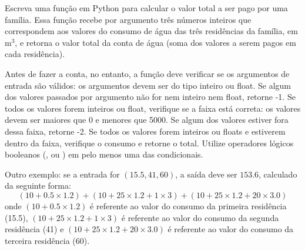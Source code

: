 \begin{enumerate}[label=\textbf{Q\arabic*.}]
    Escreva uma função em Python para calcular o valor total a ser pago por uma família. Essa função recebe por argumento três números inteiros que correspondem aos valores do consumo de água das três residências da família, em $\text{m}^3$, e retorna o valor total da conta de água (soma dos valores a serem pagos em cada residência).

    Antes de fazer a conta, no entanto, a função deve verificar se os argumentos de entrada são válidos: os argumentos devem ser do tipo inteiro ou float. Se algum dos valores passados por argumento não for nem inteiro nem float, retorne -1. Se todos os valores forem inteiros ou float, verifique se a faixa está correta: os valores devem ser maiores que 0 e menores que 5000. Se algum dos valores estiver fora dessa faixa, retorne -2. Se todos os valores forem inteiros ou floats e estiverem dentro da faixa, verifique o consumo e retorne o total. Utilize operadores lógicos booleanos (,  ou ) em pelo menos uma das condicionais. 

    Outro exemplo: se a entrada for $(15.5, 41, 60)$, a saída deve ser $153.6$, calculado da seguinte forma: 
    $$(10 + 0.5 \times 1.2) + (10 + 25 \times 1.2 + 1 \times 3) + (10 + 25 \times 1.2 + 20 \times 3.0)$$ 
    onde $(10 + 0.5 \times 1.2)$ é referente ao valor do consumo da primeira residência (15.5), $(10 + 25 \times 1.2 + 1 \times 3)$ é referente ao valor do consumo da segunda residência (41) e $(10 + 25 \times 1.2 + 20 \times 3.0)$ é referente ao valor do consumo da terceira residência (60).

    
\end{enumerate}